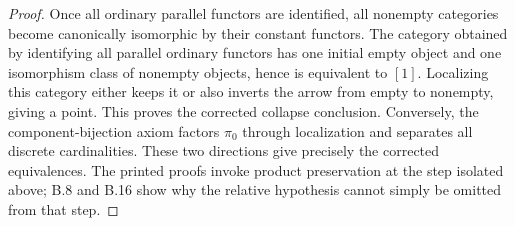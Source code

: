 \begin{proof}
Once all ordinary parallel functors are identified, all nonempty
categories become canonically isomorphic by their constant functors.
The category obtained by identifying all parallel ordinary functors
has one initial empty object and one isomorphism class of nonempty
objects, hence is equivalent to $[1]$. Localizing this category
either keeps it or also inverts the arrow from empty to nonempty,
giving a point. This proves the corrected collapse conclusion.
Conversely, the component-bijection axiom factors $\pi_0$ through
localization and separates all discrete cardinalities. These two
directions give precisely the corrected equivalences. The printed
proofs invoke product preservation at the step isolated above;
B.8 and B.16 show why the relative hypothesis cannot simply be
omitted from that step.
\end{proof}
